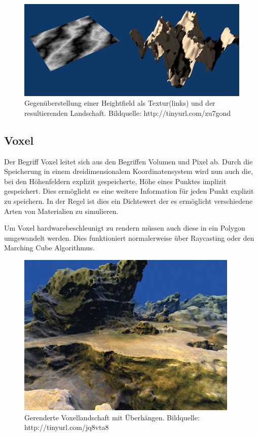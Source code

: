 \begin{figure}
	\centering
	\includegraphics[width=\textwidth]{images/heightfield_rendered.png}
	\caption{Gegenüberstellung einer Heightfield als Textur(links) und der resultierenden Landschaft. Bildquelle: http://tinyurl.com/zu7gond}\label{img.heightfield}
\end{figure}

\subsection{Voxel}
Der Begriff Voxel leitet sich aus den Begriffen Volumen und Pixel ab.
Durch die Speicherung in einem dreidimensionalem Koordinatensystem wird nun auch die, bei den Höhenfeldern explizit gespeicherte, Höhe eines Punktes implizit gespeichert. Dies ermöglicht es eine weitere Information für jeden Punkt explizit zu speichern. In der Regel ist dies ein Dichtewert der es ermöglicht verschiedene Arten von Materialien zu simulieren.

Um Voxel hardwarebeschleunigt zu rendern müssen auch diese in ein Polygon umgewandelt werden. Dies funktioniert normalerweise über Raycasting oder den Marching Cube Algorithmus.

\begin{figure}
	\centering
	\includegraphics[width=\textwidth]{images/voxel_rendered.jpg}
	\caption{Gerenderte Voxellandschaft mit Überhängen. Bildquelle: http://tinyurl.com/jq8vta8}\label{img.heightfield}
\end{figure}

